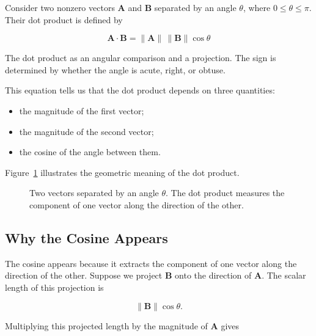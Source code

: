 Consider two nonzero vectors $\mathbf A$ and $\mathbf B$ separated by an angle
$\theta$, where $0\leq\theta\leq\pi$. Their dot product is defined by

\[
\boxed{
\mathbf A\cdot\mathbf B
=
\lVert\mathbf A\rVert\,\lVert\mathbf B\rVert\cos\theta
}
\]

\begin{bookfigure}{The dot product as an angular comparison and a projection. The sign is determined by whether the angle is acute, right, or obtuse.}

\end{bookfigure}

This equation tells us that the dot product depends on three quantities:

\begin{itemize}
  \item the magnitude of the first vector;
  \item the magnitude of the second vector;
  \item the cosine of the angle between them.
\end{itemize}

Figure~\ref{fig:dot-product-angle} illustrates the geometric meaning of the dot
product.

\begin{figure}[htbp]
  \centering
  \begingroup
  
  \endgroup
  \caption{Two vectors separated by an angle $\theta$. The dot product measures
  the component of one vector along the direction of the other.}
  \label{fig:dot-product-angle}
\end{figure}

\subsection{Why the Cosine Appears}

The cosine appears because it extracts the component of one vector along the
direction of the other. Suppose we project $\mathbf B$ onto the direction of
$\mathbf A$. The scalar length of this projection is

\[
\lVert\mathbf B\rVert\cos\theta.
\]

Multiplying this projected length by the magnitude of $\mathbf A$ gives

